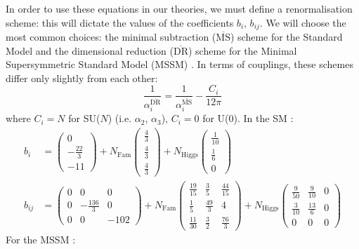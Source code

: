 \documentclass[12pt,a4paper,oneside]{article}
\begin{document}
In order to use these equations in our theories, we must define a renormalisation scheme: this will dictate the values of the coefficients $b_i$, $b_{ij}$. We will choose the most common choices: the minimal subtraction ($\overline{\mathrm{MS}}$) scheme for the Standard Model \cite{ms} and the dimensional reduction ($\overline{\mathrm{DR}}$) scheme for the Minimal Supersymmetric Standard Model (MSSM) \cite{dr}. In terms of couplings, these schemes differ only slightly from each other:
\[
\frac{1}{\alpha_i^\mathrm{\overline{DR}}} = \frac{1}{\alpha_i^\mathrm{\overline{MS}}} - \frac{C_i}{12 \pi}
\]
where $C_i = N$ for SU($N$) (i.e. $\alpha_2$, $\alpha_3$), $C_i = 0$ for U(0).
In the SM \cite{b}:
\singlespace %
\begin{align}
b_i &= 
\begin{pmatrix} 0 \\ -\frac{22}{3} \\ -11 \end{pmatrix} 
+ N_\mathrm{Fam} \begin{pmatrix} \frac{4}{3} \\ \frac{4}{3} \\ \frac{4}{3} \end{pmatrix} 
+ N_\mathrm{Higgs} \begin{pmatrix} \frac{1}{10} \\ \frac{1}{6} \\ 0 \end{pmatrix} \\
b_{ij} &= 
\begin{pmatrix} 
0 & 0 & 0 \\ 
0 & -\frac{136}{3} & 0 \\ 
0 & 0 & -102 
\end{pmatrix}
+ N_\mathrm{Fam} 
\begin{pmatrix} 
\frac{19}{15} & \frac{3}{5} & \frac{44}{15} \\ 
\frac{1}{5} & \frac{49}{3} & 4 \\ 
\frac{11}{30} & \frac{3}{2} & \frac{76}{3}
\end{pmatrix}
+ N_\mathrm{Higgs}
\begin{pmatrix}
\frac{9}{50} & \frac{9}{10} & 0 \\
\frac{3}{10} & \frac{13}{6} & 0 \\
0 & 0 & 0
\end{pmatrix} 
\end{align}
For the MSSM \cite{b}:
\end{document}
